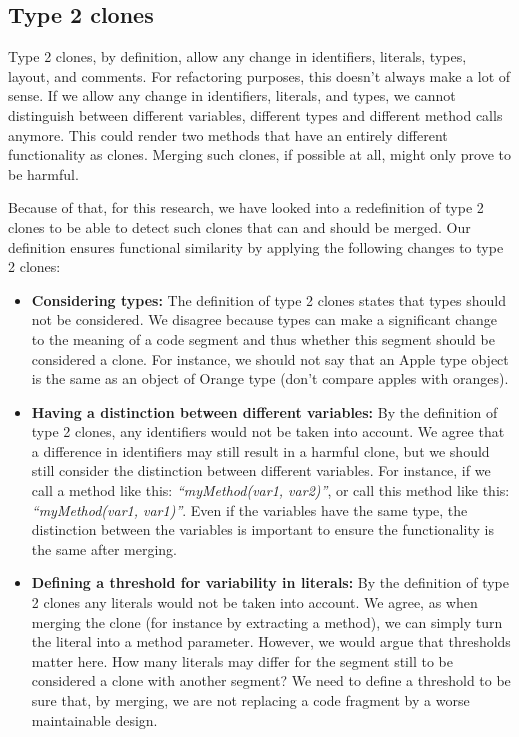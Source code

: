 \documentclass[a4paper]{article}
\begin{document}
\subsection{Type 2 clones}
Type 2 clones, by definition, allow any change in identifiers, literals, types, layout, and comments. For refactoring purposes, this doesn't always make a lot of sense. If we allow any change in identifiers, literals, and types, we cannot distinguish between different variables, different types and different method calls anymore. This could render two methods that have an entirely different functionality as clones. Merging such clones, if possible at all, might only prove to be harmful.

Because of that, for this research, we have looked into a redefinition of type 2 clones to be able to detect such clones that can and should be merged. Our definition ensures functional similarity by applying the following changes to type 2 clones:

\begin{itemize}
  \item \textbf{Considering types:} The definition of type 2 clones states that types should not be considered. We disagree because types can make a significant change to the meaning of a code segment and thus whether this segment should be considered a clone. For instance, we should not say that an Apple type object is the same as an object of Orange type (don't compare apples with oranges).
  \item \textbf{Having a distinction between different variables:} By the definition of type 2 clones, any identifiers would not be taken into account. We agree that a difference in identifiers may still result in a harmful clone, but we should still consider the distinction between different variables. For instance, if we call a method like this: \textit{``myMethod(var1, var2)''}, or call this method like this: \textit{``myMethod(var1, var1)''}. Even if the variables have the same type, the distinction between the variables is important to ensure the functionality is the same after merging.
  \item \textbf{Defining a threshold for variability in literals:} By the definition of type 2 clones any literals would not be taken into account. We agree, as when merging the clone (for instance by extracting a method), we can simply turn the literal into a method parameter. However, we would argue that thresholds matter here. How many literals may differ for the segment still to be considered a clone with another segment? We need to define a threshold to be sure that, by merging, we are not replacing a code fragment by a worse maintainable design.
\end{itemize}
\end{document}
